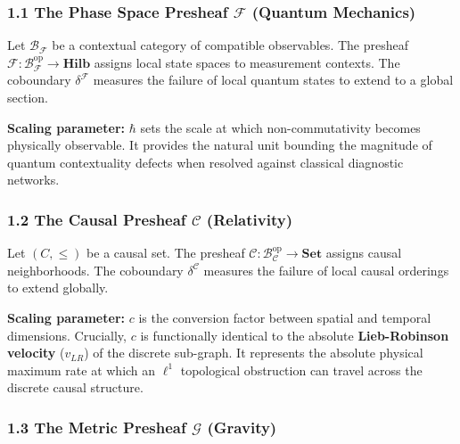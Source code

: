 \documentclass[
]{article}
\begin{document}
\subsubsection{\texorpdfstring{1.1 The Phase Space Presheaf
\(\mathcal{F}\) (Quantum
Mechanics)}{1.1 The Phase Space Presheaf \textbackslash mathcal\{F\} (Quantum Mechanics)}}\label{the-phase-space-presheaf-mathcalf-quantum-mechanics}

Let \(\mathcal{B}_\mathcal{F}\) be a contextual category of compatible
observables. The presheaf
\(\mathcal{F} : \mathcal{B}_\mathcal{F}^{\mathrm{op}} \to \mathbf{Hilb}\)
assigns local state spaces to measurement contexts. The coboundary
\(\delta^\mathcal{F}\) measures the failure of local quantum states to
extend to a global section.

\textbf{Scaling parameter:} \(\hbar\) sets the scale at which
non-commutativity becomes physically observable. It provides the natural
unit bounding the magnitude of quantum contextuality defects when
resolved against classical diagnostic networks.

\subsubsection{\texorpdfstring{1.2 The Causal Presheaf \(\mathcal{C}\)
(Relativity)}{1.2 The Causal Presheaf \textbackslash mathcal\{C\} (Relativity)}}\label{the-causal-presheaf-mathcalc-relativity}

Let \((C, \leq)\) be a causal set. The presheaf
\(\mathcal{C} : \mathcal{B}_\mathcal{C}^{\mathrm{op}} \to \mathbf{Set}\)
assigns causal neighborhoods. The coboundary \(\delta^\mathcal{C}\)
measures the failure of local causal orderings to extend globally.

\textbf{Scaling parameter:} \(c\) is the conversion factor between
spatial and temporal dimensions. Crucially, \(c\) is functionally
identical to the absolute \textbf{Lieb-Robinson velocity} (\(v_{LR}\))
of the discrete sub-graph. It represents the absolute physical maximum
rate at which an \(\ell^1\) topological obstruction can travel across
the discrete causal structure.

\subsubsection{\texorpdfstring{1.3 The Metric Presheaf \(\mathcal{G}\)
(Gravity)}{1.3 The Metric Presheaf \textbackslash mathcal\{G\} (Gravity)}}\label{the-metric-presheaf-mathcalg-gravity}
\end{document}
